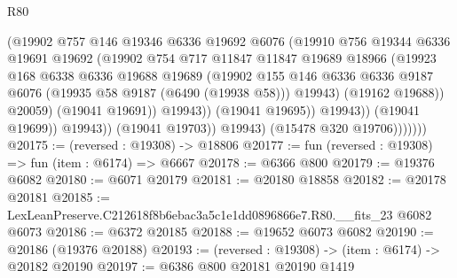 \begin{lexlean}{R80}
\begin{coremodule}
                                  (@19902
                                    @757
                                    @146
                                    @19346
                                    @6336
                                    @19692
                                    @6076
                                    (@19910
                                      @756
                                      @19344
                                      @6336
                                      @19691
                                      @19692
                                      (@19902
                                        @754
                                        @717
                                        @11847
                                        @11847
                                        @19689
                                        @18966
                                        (@19923
                                          @168
                                          @6338
                                          @6336
                                          @19688
                                          @19689
                                          (@19902
                                            @155
                                            @146
                                            @6336
                                            @6336
                                            @9187
                                            @6076
                                            (@19935 @58 @9187 (@6490 (@19938 @58)))
                                            @19943)
                                          (@19162 @19688))
                                        @20059)
                                      (@19041 @19691))
                                    @19943))
                                (@19041 @19695))
                              @19943))
                          (@19041 @19699))
                        @19943))
                    (@19041 @19703))
                  @19943)
                (@15478 @320 @19706)))))))
@20175 := (reversed : @19308) -> @18806
@20177 := fun (reversed : @19308) => fun (item : @6174) => @6667
@20178 := @6366 @800
@20179 := @19376 @6082
@20180 := @6071 @20179
@20181 := @20180 @18858
@20182 := @20178 @20181
@20185 := LexLeanPreserve.C212618f8b6ebac3a5c1e1dd0896866e7.R80.__fits_23 @6082 @6073
@20186 := @6372 @20185
@20188 := @19652 @6073 @6082
@20190 := @20186 (@19376 @20188)
@20193 := (reversed : @19308) -> (item : @6174) -> @20182 @20190
@20197 := @6386 @800 @20181 @20190 @1419

\end{coremodule}
\end{lexlean}
